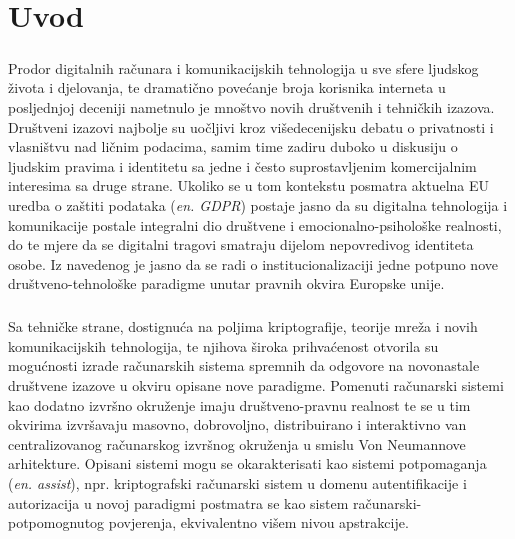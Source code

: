 \chapter{Uvod}
\paragraph*{}
Prodor digitalnih računara i komunikacijskih tehnologija u sve sfere ljudskog života i djelovanja, te dramatično povećanje broja korisnika interneta u posljednjoj deceniji nametnulo je mnoštvo novih društvenih i tehničkih izazova. Društveni izazovi najbolje su uočljivi kroz višedecenijsku debatu o privatnosti i vlasništvu nad ličnim podacima, samim time zadiru duboko u diskusiju o ljudskim pravima i identitetu sa jedne i često suprostavljenim komercijalnim interesima sa druge strane. Ukoliko se u tom kontekstu posmatra aktuelna EU uredba o zaštiti podataka\cite{gdpr} (\textit{en. GDPR}) postaje jasno da su digitalna tehnologija i komunikacije postale integralni dio društvene i emocionalno-psihološke realnosti\cite{Searle1995}, do te mjere da se digitalni tragovi smatraju dijelom nepovredivog identiteta osobe. Iz navedenog je jasno da se radi o institucionalizaciji jedne potpuno nove društveno-tehnološke paradigme unutar pravnih okvira Europske unije.

\paragraph*{}
Sa tehničke strane, dostignuća na poljima kriptografije, teorije mreža i novih komunikacijskih tehnologija, te njihova široka prihvaćenost otvorila su mogućnosti izrade računarskih sistema spremnih da odgovore na novonastale društvene izazove u okviru opisane nove paradigme. Pomenuti računarski sistemi kao dodatno izvršno okruženje imaju društveno-pravnu realnost te se u tim okvirima izvršavaju masovno, dobrovoljno, distribuirano i interaktivno\cite{Cahill2003} van centralizovanog računarskog izvršnog okruženja u smislu Von Neumannove arhitekture. Opisani sistemi mogu se okarakterisati kao sistemi potpomaganja (\textit{en. assist}), npr. kriptografski računarski sistem u domenu autentifikacije i autorizacija u novoj paradigmi postmatra se kao sistem računarski-potpomognutog povjerenja, ekvivalentno višem nivou apstrakcije.

